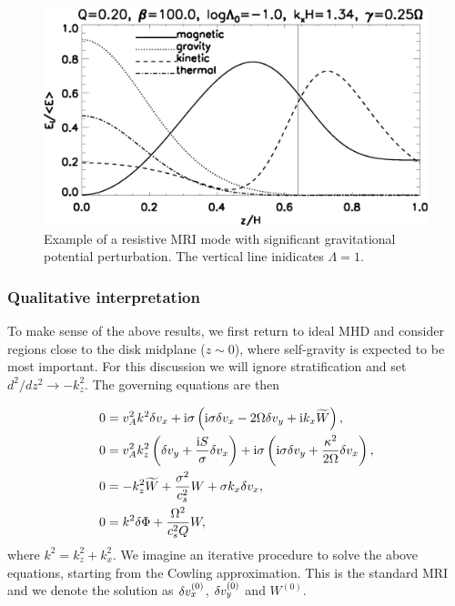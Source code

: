 \begin{figure}
  \includegraphics[width=\linewidth]{figures/result_resis_sg}
  \caption{Example of a resistive MRI mode with significant
    gravitational potential perturbation.  The vertical line
    inidicates $\Lambda=1$.  
    \label{mri_massive_resis}}
\end{figure}

\subsubsection{Qualitative interpretation} 
To make sense of the above results, we first return to ideal MHD and 
consider regions close to the disk midplane ($z\sim 0$), where
self-gravity is expected to be most important. For this discussion we
will ignore stratification and set $d^2/dz^2\to -k_z^2$. The governing
equations are then 

\begin{align}
  &  0= v_A^2k^2\delta v_x + \mathrm{i}\sigma\left(\mathrm{i}\sigma \delta v_x - 2\Omega\delta v_y + \mathrm{i} k_x \widetilde{W}\right),\label{simp1}\\
  &  0= v_A^2k_z^2\left(\delta v_y + \frac{\mathrm{i} S
  }{\sigma}\delta v_x\right) + \mathrm{i}\sigma\left(\mathrm{i}\sigma\delta v_y +
  \frac{\kappa^2}{2\Omega}\delta v_x\right),\label{simp2}\\
  & 0 = -k_z^2\widetilde{W} + \frac{\sigma^2}{c_s^2}W + \sigma k_x \delta v_x, \label{simp3}\\
  & 0 = k^2\delta \Phi + \frac{\Omega^2}{c_s^2Q}W,\label{simp4}
\end{align}
where $k^2 = k_z^2 + k_x^2$. We imagine an iterative procedure to
solve the above equations, starting from the Cowling approximation. 
This is the standard MRI and we denote the solution as
$\delta v_x^{(0)}$, $\delta v_y^{(0)}$ and $W^{(0)}$. 

